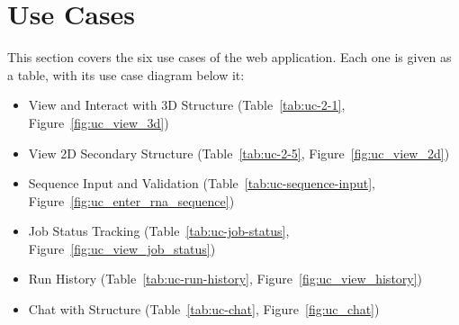 \documentclass{FastFyp}
\begin{document}
\section{Use Cases}
\label{sec:usecases}
This section covers the six use cases of the web application. Each one is given as a table, with its use case diagram below it:
\begin{itemize}
\item View and Interact with 3D Structure (Table~\ref{tab:uc-2-1}, Figure~\ref{fig:uc_view_3d})
\item View 2D Secondary Structure (Table~\ref{tab:uc-2-5}, Figure~\ref{fig:uc_view_2d})
\item Sequence Input and Validation (Table~\ref{tab:uc-sequence-input}, Figure~\ref{fig:uc_enter_rna_sequence})
\item Job Status Tracking (Table~\ref{tab:uc-job-status}, Figure~\ref{fig:uc_view_job_status})
\item Run History (Table~\ref{tab:uc-run-history}, Figure~\ref{fig:uc_view_history})
\item Chat with Structure (Table~\ref{tab:uc-chat}, Figure~\ref{fig:uc_chat})
\end{itemize}
\end{document}
